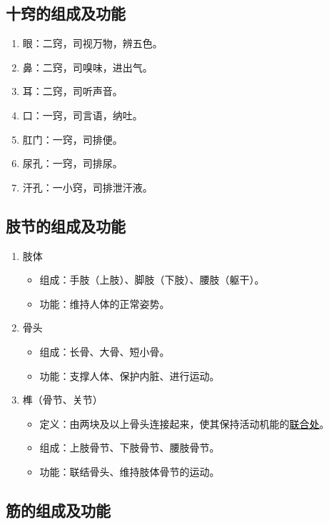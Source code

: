 \documentclass[cn,black,12pt,normal,founder]{elegantnote}
\newcommand{\redt}[1]{\textcolor{black}{{}#1}}      %
\begin{document}
\subsection{十窍的组成及功能}

\begin{enumerate}
  \item 眼：二窍，司视万物，辨五色。
  \item 鼻：二窍，司嗅味，进出气。
  \item 耳：二窍，司听声音。
  \item 口：一窍，司言语，纳吐。
  \item 肛门：一窍，司排便。
  \item 尿孔：一窍，司排尿。
  \item 汗孔：一小窍，司排泄汗液。
\end{enumerate}

\subsection{肢节的组成及功能}

\begin{enumerate}
  \item 肢体
  \begin{itemize}
    \item 组成：手肢（上肢）、脚肢（下肢）、腰肢（躯干）。
    \item 功能：维持人体的正常姿势。
  \end{itemize}
  \item 骨头
  \begin{itemize}
    \item 组成：长骨、大骨、短小骨。
    \item 功能：支撑人体、保护内脏、进行运动。
  \end{itemize}
  \item 榫（骨节、关节）
  \begin{itemize}
    \item 定义：由两块及以上骨头连接起来，使其保持活动机能的\redt{\uline{联合处}}。
    \item 组成：上肢骨节、下肢骨节、腰肢骨节。
    \item 功能：联结骨头、维持肢体骨节的运动。
  \end{itemize}
\end{enumerate}

\subsection{筋的组成及功能}
\end{document}
